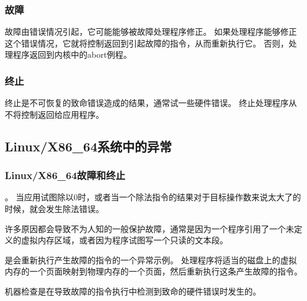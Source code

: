 {{        \subsubsection{故障}
        {
            故障由错误情况引起，它可能能够被故障处理程序修正。
            如果处理程序能够修正这个错误情况，它就将控制返回到引起故障的指令，从而重新执行它。
            否则，处理程序返回到内核中的abort例程。
        }

        \subsubsection{终止}
        {
            终止是不可恢复的致命错误造成的结果，通常试一些硬件错误。
            终止处理程序从不将控制返回给应用程序。
        }
    }

    \subsection{Linux/X86\_64系统中的异常}
    {
        \subsubsection{Linux/X86\_64故障和终止}
        {
            。
            当应用试图除以0时，或者当一个除法指令的结果对于目标操作数来说太大了的时候，就会发生除法错误。

            许多原因都会导致不为人知的一般保护故障，通常是因为一个程序引用了一个未定义的虚拟内存区域，或者因为程序试图写一个只读的文本段。

            是会重新执行产生故障的指令的一个异常示例。
            处理程序将适当的磁盘上的虚拟内存的一个页面映射到物理内存的一个页面，然后重新执行这条产生故障的指令。

            机器检查是在导致故障的指令执行中检测到致命的硬件错误时发生的。
        }
    }
}
